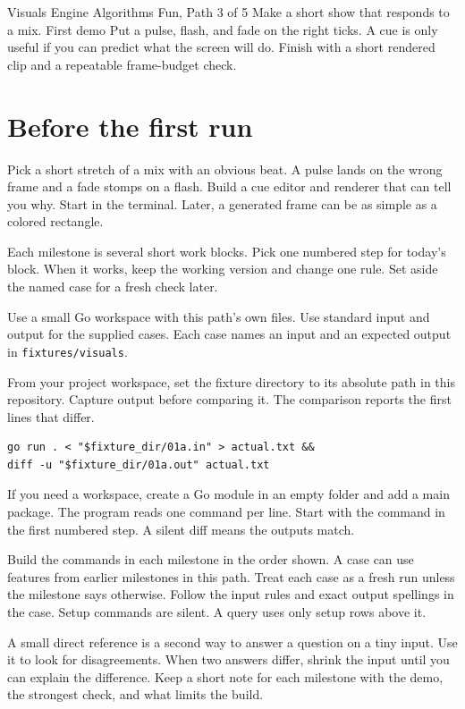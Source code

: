 \documentclass[11pt,letterpaper]{article}
\begin{document}
\coursecover
  {Visuals Engine}
  {Algorithms Fun, Path 3 of 5}
  {Make a short show that responds to a mix.}
  {First demo}
  {Put a pulse, flash, and fade on the right ticks.}
  {A cue is only useful if you can predict what the screen will do.}
  {Finish with a short rendered clip and a repeatable frame-budget check.}
\tableofcontents
\clearpage
\section{Before the first run}
Pick a short stretch of a mix with an obvious beat. A pulse lands on the wrong frame and a fade stomps on a flash. Build a cue editor and renderer that can tell you why. Start in the terminal. Later, a generated frame can be as simple as a colored rectangle.

Each milestone is several short work blocks. Pick one numbered step for today's block. When it works, keep the working version and change one rule. Set aside the named case for a fresh check later.

Use a small Go workspace with this path's own files. Use standard input and output for the supplied cases. Each case names an input and an expected output in \texttt{fixtures/visuals}.

From your project workspace, set the fixture directory to its absolute path in this repository. Capture output before comparing it. The comparison reports the first lines that differ.
\begin{samepage}
\small
\begin{verbatim}
go run . < "$fixture_dir/01a.in" > actual.txt &&
diff -u "$fixture_dir/01a.out" actual.txt
\end{verbatim}
\end{samepage}

If you need a workspace, create a Go module in an empty folder and add a main package. The program reads one command per line. Start with the command in the first numbered step. A silent diff means the outputs match.

Build the commands in each milestone in the order shown. A case can use features from earlier milestones in this path. Treat each case as a fresh run unless the milestone says otherwise. Follow the input rules and exact output spellings in the case. Setup commands are silent. A query uses only setup rows above it.

A small direct reference is a second way to answer a question on a tiny input. Use it to look for disagreements. When two answers differ, shrink the input until you can explain the difference. Keep a short note for each milestone with the demo, the strongest check, and what limits the build.
\end{document}
